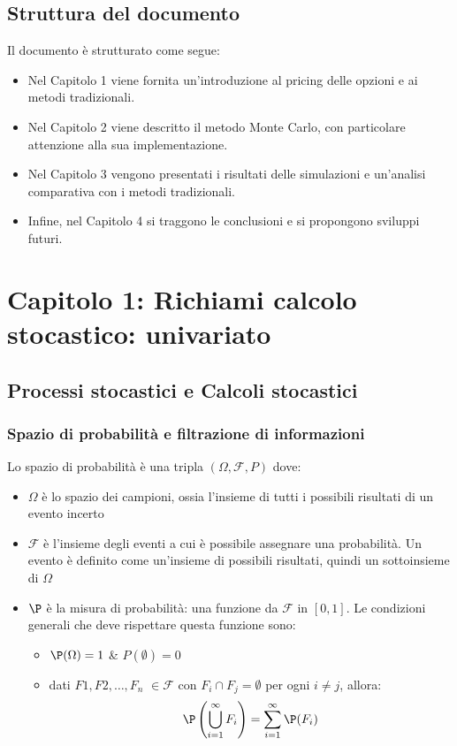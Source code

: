 \documentclass[12pt,a4paper]{report}
\begin{document}
\subsection{Struttura del documento}
Il documento è strutturato come segue:
\begin{itemize}
    \item Nel Capitolo 1 viene fornita un'introduzione al pricing delle opzioni e ai metodi tradizionali.
    \item Nel Capitolo 2 viene descritto il metodo Monte Carlo, con particolare attenzione alla sua implementazione.
    \item Nel Capitolo 3 vengono presentati i risultati delle simulazioni e un'analisi comparativa con i metodi tradizionali.
    \item Infine, nel Capitolo 4 si traggono le conclusioni e si propongono sviluppi futuri.
\end{itemize}

\newpage


\section{Capitolo 1: Richiami calcolo stocastico: univariato}
\subsection{Processi stocastici e Calcoli stocastici}
\subsubsection{Spazio di probabilità e filtrazione di informazioni}
Lo spazio di probabilità è una tripla \((\Omega, \mathcal{F}, P)\) dove:
\begin{itemize}
    \item \(\Omega\) è lo spazio dei campioni, ossia l'insieme di tutti i possibili risultati di un evento incerto
    \item \(\mathcal{F}\) è l'insieme degli eventi a cui è possibile assegnare una probabilità. Un evento è definito come un'insieme di possibili risultati, quindi un sottoinsieme di \(\Omega\)
    \item \(\P\) è la misura di probabilità: una funzione da \(\mathcal{F}\) in \([0, 1]\). Le condizioni generali che deve rispettare questa funzione sono:
    \begin{itemize}
        \item \(\P(\Omega) = 1\) & \(P(\emptyset) = 0\)
        \item dati \(F1, F2, \ldots, F_n\) \(\in \mathcal{F}\) con \(F_i \cap F_j = \emptyset\) per ogni \(i \neq j\), allora:
\[
\P\left(\bigcup_{i=1}^{\infty} F_i\right) = \sum_{i=1}^{\infty} \P(F_i)
\]
    \end{itemize}
\end{itemize}
\end{document}
